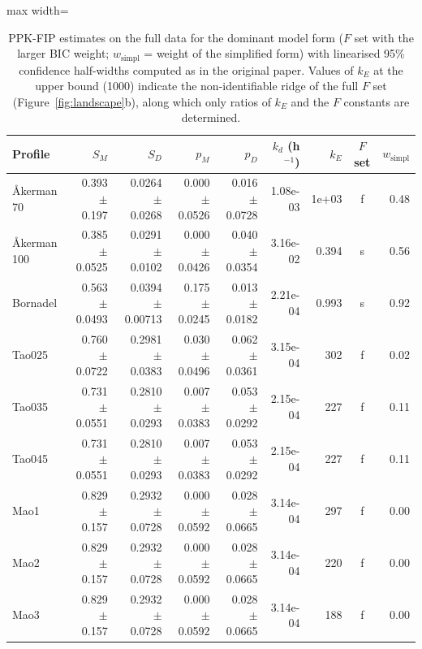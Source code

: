 \begin{table}[t]
\centering
\caption{PPK-FIP estimates on the full data for the dominant model form ($F$ set with the larger BIC weight; $w_\mathrm{simpl}$ = weight of the simplified form) with linearised 95\% confidence half-widths computed as in the original paper. Values of $k_E$ at the upper bound (1000) indicate the non-identifiable ridge of the full $F$ set (Figure~\ref{fig:landscape}b), along which only ratios of $k_E$ and the $F$ constants are determined.}\label{tab:params}
\footnotesize
\begin{adjustbox}{max width=\linewidth}
\begin{tabular}{lrrrrrrcr}
\toprule
Profile & $S_M$ & $S_D$ & $p_M$ & $p_D$ & $k_d$ (h$^{-1}$) & $k_E$ & $F$ set & $w_\mathrm{simpl}$ \\
\midrule
Åkerman 70 & 0.393 $\pm$ 0.197 & 0.0264 $\pm$ 0.0268 & 0.000 $\pm$ 0.0526 & 0.016 $\pm$ 0.0728 & 1.08e-03 & 1e+03 & f & 0.48 \\
Åkerman 100 & 0.385 $\pm$ 0.0525 & 0.0291 $\pm$ 0.0102 & 0.000 $\pm$ 0.0426 & 0.040 $\pm$ 0.0354 & 3.16e-02 & 0.394 & s & 0.56 \\
Bornadel & 0.563 $\pm$ 0.0493 & 0.0394 $\pm$ 0.00713 & 0.175 $\pm$ 0.0245 & 0.013 $\pm$ 0.0182 & 2.21e-04 & 0.993 & s & 0.92 \\
Tao025 & 0.760 $\pm$ 0.0722 & 0.2981 $\pm$ 0.0383 & 0.030 $\pm$ 0.0496 & 0.062 $\pm$ 0.0361 & 3.15e-04 & 302 & f & 0.02 \\
Tao035 & 0.731 $\pm$ 0.0551 & 0.2810 $\pm$ 0.0293 & 0.007 $\pm$ 0.0383 & 0.053 $\pm$ 0.0292 & 2.15e-04 & 227 & f & 0.11 \\
Tao045 & 0.731 $\pm$ 0.0551 & 0.2810 $\pm$ 0.0293 & 0.007 $\pm$ 0.0383 & 0.053 $\pm$ 0.0292 & 2.15e-04 & 227 & f & 0.11 \\
Mao1 & 0.829 $\pm$ 0.157 & 0.2932 $\pm$ 0.0728 & 0.000 $\pm$ 0.0592 & 0.028 $\pm$ 0.0665 & 3.14e-04 & 297 & f & 0.00 \\
Mao2 & 0.829 $\pm$ 0.157 & 0.2932 $\pm$ 0.0728 & 0.000 $\pm$ 0.0592 & 0.028 $\pm$ 0.0665 & 3.14e-04 & 220 & f & 0.00 \\
Mao3 & 0.829 $\pm$ 0.157 & 0.2932 $\pm$ 0.0728 & 0.000 $\pm$ 0.0592 & 0.028 $\pm$ 0.0665 & 3.14e-04 & 188 & f & 0.00 \\
\bottomrule
\end{tabular}
\end{adjustbox}
\end{table}
